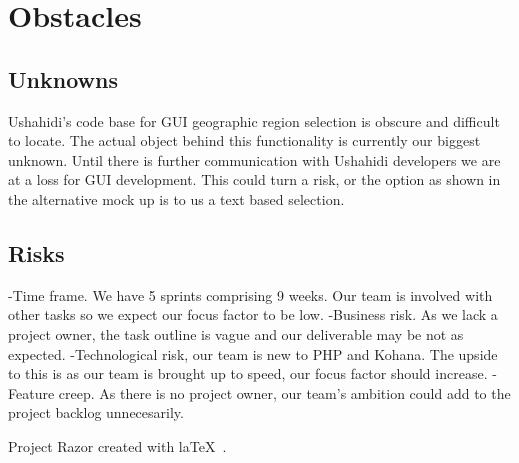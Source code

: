 \documentclass{article}
\begin{document}
\section{Obstacles}
\subsection{Unknowns}
Ushahidi's code base for GUI geographic region selection is obscure and difficult to locate. The actual object behind this functionality is currently our biggest unknown. Until there is further communication with Ushahidi developers we are at a loss for GUI development. This could turn a risk, or the option as shown in the alternative mock up is to us a text based selection.
\subsection{Risks}
-Time frame. We have 5 sprints comprising 9 weeks. Our team is involved with other tasks so we expect our focus factor to be low.
-Business risk. As we lack a project owner, the task outline is vague and our deliverable may be not as expected.
-Technological risk, our team is new to PHP and Kohana. The upside to this is as our team is brought up to speed, our focus factor should increase.
-Feature creep. As there is no project owner, our team's ambition could add to the project backlog unnecesarily.

\vfill
\begin{center}
Project Razor created with la\TeX~.
\end{center}
\end{document}
